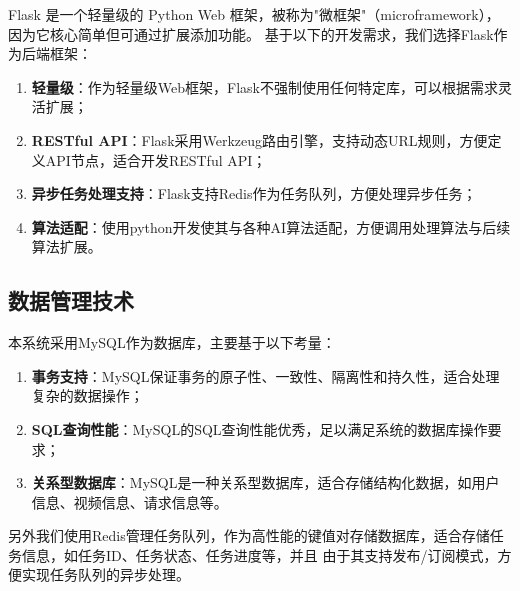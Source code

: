 Flask 是一个轻量级的 Python Web 框架，被称为"微框架"（microframework），因为它核心简单但可通过扩展添加功能。
基于以下的开发需求，我们选择Flask作为后端框架：
\begin{enumerate}
    \item \textbf{轻量级}：作为轻量级Web框架，Flask不强制使用任何特定库，可以根据需求灵活扩展；
    \item \textbf{RESTful API}：Flask采用Werkzeug路由引擎，支持动态URL规则，方便定义API节点，适合开发RESTful API；
    \item \textbf{异步任务处理支持}：Flask支持Redis作为任务队列，方便处理异步任务；
    \item \textbf{算法适配}：使用python开发使其与各种AI算法适配，方便调用处理算法与后续算法扩展。
\end{enumerate}

\subsection{数据管理技术}

本系统采用MySQL作为数据库，主要基于以下考量：
\begin{enumerate}
    \item \textbf{事务支持}：MySQL保证事务的原子性、一致性、隔离性和持久性，适合处理复杂的数据操作；
    \item \textbf{SQL查询性能}：MySQL的SQL查询性能优秀，足以满足系统的数据库操作要求；
    \item \textbf{关系型数据库}：MySQL是一种关系型数据库，适合存储结构化数据，如用户信息、视频信息、请求信息等。
\end{enumerate}

另外我们使用Redis管理任务队列，作为高性能的键值对存储数据库，适合存储任务信息，如任务ID、任务状态、任务进度等，并且
由于其支持发布/订阅模式，方便实现任务队列的异步处理。